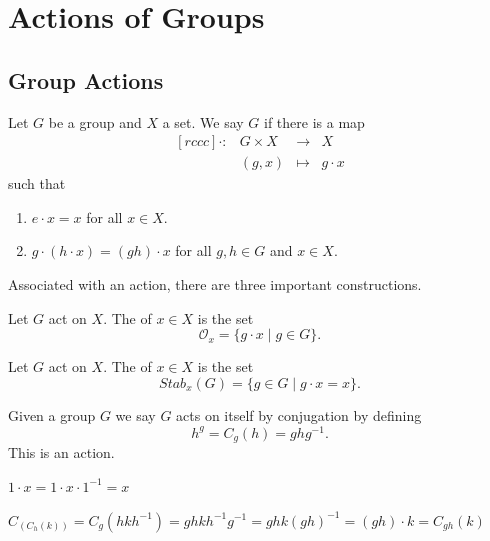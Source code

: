 \chapter{Actions of Groups}

\section{Group Actions}

\begin{definition}[Action]\label{def:action}
    Let $G$ be a group and $X$ a set. We say $G$  if there is a map \[
        \begin{matrix}[rccc]
            \cdot: & G \times X & \to     & X \\
                   & (g, x)     & \mapsto & g \cdot x
        \end{matrix}
    \] such that \begin{enumerate}
        \item $e \cdot x = x$ for all $x \in X$.
        \item $g \cdot (h \cdot x) = (gh) \cdot x$ for all $g, h \in G$ and $x \in X$.
    \end{enumerate}
\end{definition}

Associated with an action, there are three important constructions.

\begin{definition}[Orbit]\label{def:orbit}
    Let $G$ act on $X$. The  of $x \in X$ is the set \[
        \mathcal{O}_x = \{ g \cdot x \mid g \in G \}.
    \]
\end{definition}

\begin{definition}[Stabilizer]\label{def:stabilizer}
    Let $G$ act on $X$. The  of $x \in X$ is the set \[
        Stab_x(G) = \{ g \in G \mid g \cdot x = x \}.
    \]
\end{definition}

\begin{example}
    Given a group $G$ we say $G$ acts on itself by conjugation by defining \[
        h^g = C_g(h) = g h g^{-1}.
    \] This is an action. 
    \begin{listu}
        \item $1 \cdot x = 1 \cdot x \cdot 1^{-1} = x$
        \item $C_(C_h(k)) = C_g(hkh^{-1}) = ghkh^{-1}g^{-1} = ghk(gh)^{-1} = (gh) \cdot k = C_{gh}(k)$
    \end{listu}
\end{example}

